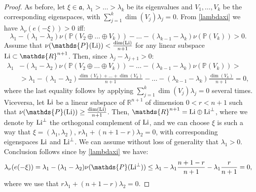 \documentclass[leqno,11pt, a4]{amsart}
\theoremstyle{named}
\begin{document}
\begin{proof}
As before, let $\xi\in \mathfrak a$, $\lambda_1>\dots>\lambda_k$ be its eigenvalues and $V_1,\dots, V_k$ be the corresponding eigenspaces, with $\sum_{j=1}^k\dim(V_j)\lambda_j=0$. From \eqref{lambdaxi} we have $\lambda_\nu(e(-\xi))>0$ iff:
\begin{equation}\label{iffstable}
\lambda_1-(\lambda_1-\lambda_2)\nu(\mathds{P}(V_2\oplus\dots\oplus V_k))-\dots-(\lambda_{k-1}-\lambda_k)\nu(\mathds{P}(V_k))>0.
\end{equation}
Assume that $\nu(\mathds{P}({\rm Li}))<\frac{\dim({\rm Li})}{n+1}$ for any linear subspace ${\rm Li}\subset \mathds{R}^{n+1}$. Then, since $\lambda_j-\lambda_{j+1}>0$:
\begin{equation}
\begin{split}
\lambda_1&-(\lambda_1-\lambda_2)\nu(\mathds{P}(V_2\oplus\dots\oplus V_k))-\dots-(\lambda_{k-1}-\lambda_k)\nu(\mathds{P}(V_k))>\\
&>\lambda_1-(\lambda_1-\lambda_2)\frac{\dim(V_2)+\dots+\dim(V_k)}{n+1}-\dots-(\lambda_{k-1}-\lambda_k)\frac{\dim({V_k})}{n+1}=0,
\end{split}\nonumber
\end{equation}
where the last equality follows by applying  $\sum_{j=1}^k\dim(V_j)\lambda_j=0$ several times.
Viceversa, let ${\rm Li}$ be a linear subspace of $\mathds{R}^{n+1}$ of dimension $0<r<n+1$ such that $\nu(\mathds{P}({\rm Li}))\geq\frac{\dim({\rm Li})}{n+1}$. Then, $\mathds{R}^{n+1}={\rm Li}\oplus {\rm Li}^\bot$, where we denote by ${\rm Li}^\bot$ the orthogonal complement of ${\rm Li}$, and we can choose $\xi$ is such a way that $\xi=(\lambda_1,\lambda_2)$, $r\lambda_1+(n+1-r)\lambda_2=0$, with corresponding eigenspaces ${\rm Li}$ and ${\rm Li}^\bot$. We can assume without loss of generality that $\lambda_1>0$. Conclusion follows since by \eqref{lambdaxi} we have:
$$
\lambda_\nu(e(-\xi))=\lambda_1-(\lambda_1-\lambda_2)\nu(\mathds{P}({\rm Li}^\bot))\leq\lambda_1-\lambda_1\frac{n+1-r}{n+1}-\lambda_1\frac{r}{n+1}=0,
$$
where we use that $r\lambda_1+(n+1-r)\lambda_2=0$.


\end{proof}
\end{document}
